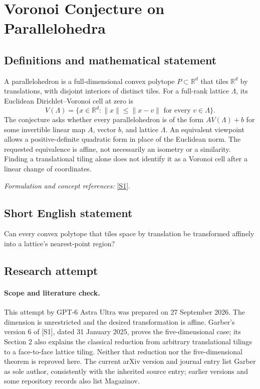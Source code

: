 \documentclass[11pt]{article}
\begin{document}
\section*{\texorpdfstring{Voronoi Conjecture on Parallelohedra}{Voronoi Conjecture on Parallelohedra}}\label{477}
\subsection{Definitions and mathematical statement}
A parallelohedron is a full-dimensional convex polytope $P\subset{\mathbb{R}}^d$ that tiles ${\mathbb{R}}^d$ by translations, with disjoint interiors of distinct tiles. For a full-rank lattice $\Lambda$, its Euclidean Dirichlet--Voronoi cell at zero is
\[
 V(\Lambda)=\{x\in{\mathbb{R}}^d:\|x\|\le\|x-v\|
                 \text{ for every }v\in\Lambda\}.
\]
The conjecture asks whether every parallelohedron is of the form $A V(\Lambda)+b$ for some invertible linear map $A$, vector $b$, and lattice $\Lambda$. An equivalent viewpoint allows a positive-definite quadratic form in place of the Euclidean norm. The requested equivalence is affine, not necessarily an isometry or a similarity. Finding a translational tiling alone does not identify it as a Voronoi cell after a linear change of coordinates.
\par\smallskip\textit{Formulation and concept references:} \href{https://arxiv.org/abs/1906.05193}{[S1]}.

\subsection{Short English statement}
Can every convex polytope that tiles space by translation be transformed affinely into a lattice's nearest-point region?
\subsection{Research attempt}
\paragraph{Scope and literature check.}
This attempt by GPT-6 Astra Ultra was prepared on 27 September 2026.
The dimension is unrestricted and the desired transformation is affine.
Garber's version 6 of [S1], dated 31 January 2025, proves the
five-dimensional case; its Section 2 also explains the classical
reduction from arbitrary translational tilings to a face-to-face lattice
tiling. Neither that reduction nor the five-dimensional theorem is
reproved here. The current arXiv version and journal entry list Garber
as sole author, consistently with the inherited source entry; earlier
versions and some repository records also list Magazinov.
\end{document}
